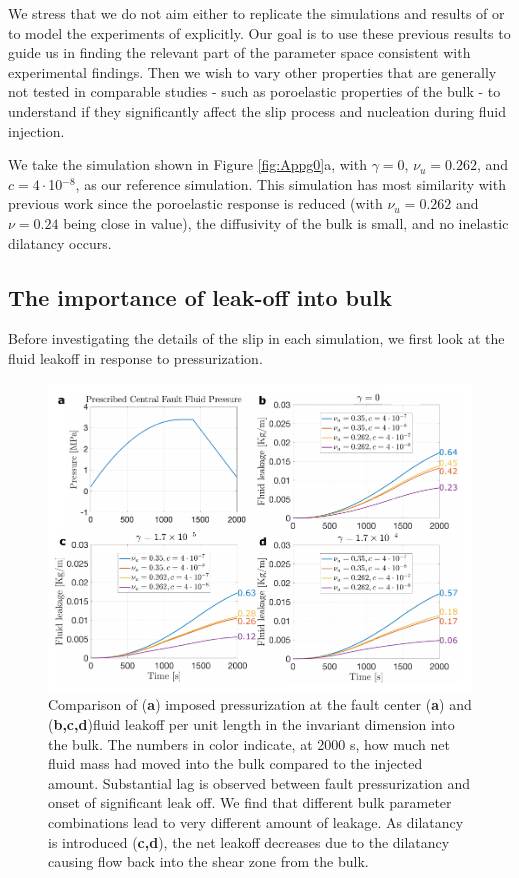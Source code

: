 \documentclass[draft]{agujournal2019}
\begin{document}
We stress that we do not aim either to replicate the simulations and results of  or to model the experiments of  explicitly. Our goal is to use these previous results to guide us in finding the relevant part of the parameter space consistent with experimental findings. Then we wish to vary other properties that are generally not tested in comparable studies - such as poroelastic properties of the bulk - to understand if they significantly affect the slip process and nucleation during fluid injection.

We take the simulation shown in Figure \ref{fig:Appg0}a, with $\gamma = 0$, $\nu_u = 0.262$, and $c = 4\cdot$10$^{-8}$, as our reference simulation. This simulation has most similarity with previous work since the poroelastic response is reduced (with $\nu_u = 0.262$ and $\nu = 0.24$ being close in value), the diffusivity of the bulk is small, and no inelastic dilatancy occurs.

\subsection{The importance of leak-off into bulk}

Before investigating the details of the slip in each simulation, we first look at the fluid leakoff in response to pressurization.

\begin{figure}[H]
\centering
\includegraphics[scale =  0.95]{Figures/pressureleakoff.pdf} %
\caption{Comparison of ({\bf a}) imposed pressurization at the fault center ({\bf a}) and ({\bf b,c,d})fluid leakoff per unit length in the invariant dimension into the bulk. The numbers in color indicate, at 2000 s, how much net fluid mass had moved into the bulk compared to the injected amount. Substantial lag is observed between fault pressurization and onset of significant leak off. We find that different bulk parameter combinations lead to very different amount of leakage. As dilatancy is introduced ({\bf c,d}), the net leakoff decreases due to the dilatancy causing flow back into the shear zone from the bulk. }
\label{fig:leak}
\end{figure}
\end{document}
